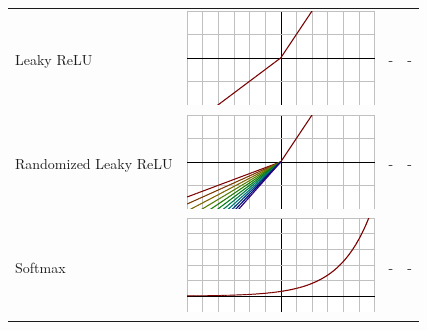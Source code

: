 \begin{tabular}{| p{25mm} | c | l | l |}
Leaky ReLU & \begin{minipage}{.2\textwidth}
      \includegraphics[width=\textwidth]{tex/images/activation/lrelu}
    \end{minipage} & - & -\\
    
Randomized \newline Leaky ReLU & \begin{minipage}{.2\textwidth}
      \includegraphics[width=\textwidth]{tex/images/activation/rlrelu}
    \end{minipage} & - & -\\
    
Softmax & \begin{minipage}{.2\textwidth}
      \includegraphics[width=\textwidth]{tex/images/activation/softmax}
    \end{minipage} & -  & -\\
    
    
\hline

\end{tabular}
